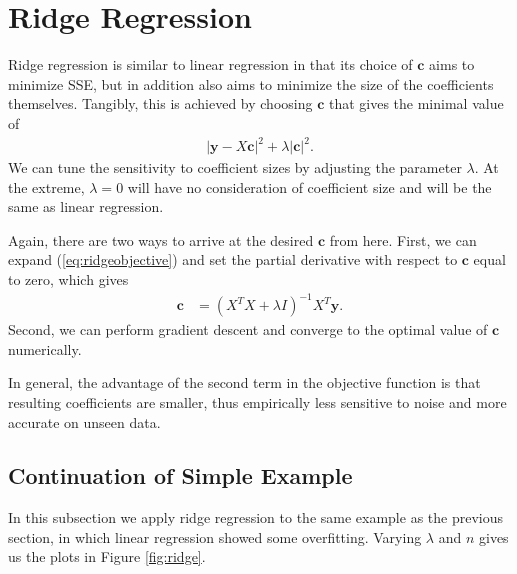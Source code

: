 \documentclass[10pt]{paper}
\begin{document}
\section{Ridge Regression}

Ridge regression is similar to linear regression in that its choice of $\bm{c}$ aims to minimize SSE, but in addition also aims to minimize the size of the coefficients themselves. Tangibly, this is achieved by choosing $\bm{c}$ that gives the minimal value of
\begin{align}
\left| \bm{y} - X \bm{c} \right|^2 + \lambda \left| \bm{c} \right|^2. \label{eq:ridgeobjective}
\end{align}
We can tune the sensitivity to coefficient sizes by adjusting the parameter $\lambda$. At the extreme, $\lambda = 0$ will have no consideration of coefficient size and will be the same as linear regression.

Again, there are two ways to arrive at the desired $\bm{c}$ from here. First, we can expand (\ref{eq:ridgeobjective}) and set the partial derivative with respect to $\bm{c}$ equal to zero, which gives
\begin{align*}
\bm{c} &= \left( X^T X + \lambda I \right)^{-1} X^T \bm{y}. \label{eq:ridgeclosed}
\end{align*}
Second, we can perform gradient descent and converge to the optimal value of $\bm{c}$ numerically.

In general, the advantage of the second term in the objective function is that resulting coefficients are smaller, thus empirically less sensitive to noise and more accurate on unseen data.

\subsection{Continuation of Simple Example}

In this subsection we apply ridge regression to the same example as the previous section, in which linear regression showed some overfitting. Varying $\lambda$ and $n$ gives us the plots in Figure \ref{fig:ridge}.
\end{document}
